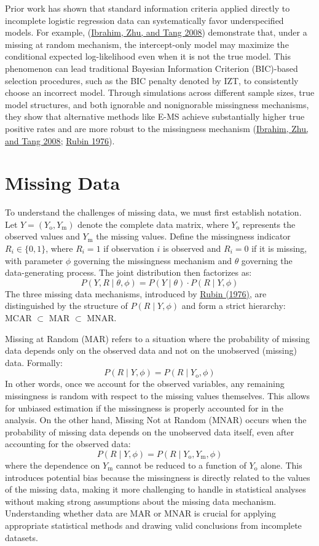\documentclass[
  12pt,
]{article}
\begin{document}
Prior work has shown that standard information criteria applied directly
to incomplete logistic regression data can systematically favor
underspecified models. For example,
(\protect\hyperlink{ref-IbrahimZhuTang2008}{Ibrahim, Zhu, and Tang
2008}) demonstrate that, under a missing at random mechanism, the
intercept-only model may maximize the conditional expected
log-likelihood even when it is not the true model. This phenomenon can
lead traditional Bayesian Information Criterion (BIC)-based selection procedures, such as the BIC penalty
denoted by IZT, to consistently choose an incorrect model. Through
simulations across different sample sizes, true model structures, and
both ignorable and nonignorable missingness mechanisms, they show that
alternative methods like E-MS achieve substantially higher true positive
rates and are more robust to the missingness mechanism
(\protect\hyperlink{ref-IbrahimZhuTang2008}{Ibrahim, Zhu, and Tang
2008}; \protect\hyperlink{ref-rubin1976inference}{Rubin 1976}).

\section{Missing Data}

To understand the challenges of missing data, we must first establish
notation. Let $Y = (Y_{\text{o}}, Y_{\text{m}})$
denote the complete data matrix, where $Y_{\text{o}}$ represents
the observed values and $Y_{\text{m}}$ the missing values. Define
the missingness indicator $R_i \in \{0,1\}$, where $R_i = 1$ if observation
$i$ is observed and $R_i = 0$ if it is missing, with parameter
$\phi$ governing the missingness mechanism and $\theta$
governing the data-generating process. The joint distribution then factorizes as:
\[
P(Y, R \mid \theta, \phi) =
P(Y \mid \theta) \cdot
P(R \mid Y, \phi)
\]
The three missing data mechanisms, introduced by
\protect\hyperlink{ref-rubin1976inference}{Rubin (1976)},
are distinguished by the structure of
$P(R \mid Y, \phi)$
and form a strict hierarchy: MCAR $\subset$ MAR $\subset$ MNAR.

Missing at Random (MAR) refers to a situation where the probability of
missing data depends only on the observed data and not on the unobserved
(missing) data. Formally:
\[
P(R \mid Y, \phi) =
P(R \mid Y_{\text{o}}, \phi)
\]
In other words, once we account for the observed variables, any remaining
missingness is random with respect to the missing values themselves. This
allows for unbiased estimation if the missingness is properly accounted for
in the analysis. On the other hand, Missing Not at Random (MNAR) occurs when
the probability of missing data depends on the unobserved data itself, even
after accounting for the observed data:
\[
P(R \mid Y, \phi) =
P(R \mid Y_{\text{o}}, Y_{\text{m}},
\phi)
\]
where the dependence on $Y_{\text{m}}$ cannot be reduced to a
function of $Y_{\text{o}}$ alone. This introduces potential bias
because the missingness is directly related to the values of the missing
data, making it more challenging to handle in statistical analyses without
making strong assumptions about the missing data mechanism. Understanding
whether data are MAR or MNAR is crucial for applying appropriate statistical
methods and drawing valid conclusions from incomplete datasets.
\end{document}

